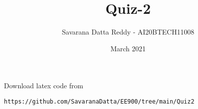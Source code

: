 \documentclass[journal,12pt,twocolumn]{IEEEtran}
\date{March 2021}
\DeclareMathOperator*{\Res}{Res}
\begin{document}
\newcommand{\multlinecomment}[1]{\directlua{-- #1}}
\newcommand{\BEQA}{\begin{eqnarray}}
\newcommand{\EEQA}{\end{eqnarray}}
\newcommand{\define}{\stackrel{\triangle}{=}}

\raggedbottom
\setlength{\parindent}{0pt}
\providecommand{\mbf}{\mathbf}
\providecommand{\pr}[1]{\ensuremath{\Pr\left(#1\right)}}
\providecommand{\qfunc}[1]{\ensuremath{Q\left(#1\right)}}
\providecommand{\fn}[1]{\ensuremath{f\left(#1\right)}}
\providecommand{\e}[1]{\ensuremath{E\left(#1\right)}}
\providecommand{\sbrak}[1]{\ensuremath{{}\left[#1\right]}}
\providecommand{\lsbrak}[1]{\ensuremath{{}\left[#1\right.}}
\providecommand{\rsbrak}[1]{\ensuremath{{}\left.#1\right]}}
\providecommand{\brak}[1]{\ensuremath{\left(#1\right)}}
\providecommand{\lbrak}[1]{\ensuremath{\left(#1\right.}}
\providecommand{\rbrak}[1]{\ensuremath{\left.#1\right)}}
\providecommand{\cbrak}[1]{\ensuremath{\left\{#1\right\}}}
\providecommand{\lcbrak}[1]{\ensuremath{\left\{#1\right.}}
\providecommand{\rcbrak}[1]{\ensuremath{\left.#1\right\}}}
\theoremstyle{remark}
\newtheorem{rem}{Remark}
\newcommand{\sgn}{\mathop{\mathrm{sgn}}}
\providecommand{\abs}[1]{\vert#1\vert}
\providecommand{\res}[1]{\Res\displaylimits_{#1}} 
\providecommand{\norm}[1]{\lVert#1\rVert}
\providecommand{\mtx}[1]{\mathbf{#1}}
\providecommand{\mean}[1]{E[ #1 ]}
\providecommand{\fourier}{\overset{\mathcal{F}}{ \rightleftharpoons}}
\providecommand{\system}{\overset{\mathcal{H}}{ \longleftrightarrow}}
\newcommand{\solution}{\noindent \textbf{Solution: }}
\newcommand{\cosec}{\,\text{cosec}\,}
\providecommand{\dec}[2]{\ensuremath{\overset{#1}{\underset{#2}{\gtrless}}}}
\newcommand{\myvec}[1]{\ensuremath{\begin{pmatrix}#1\end{pmatrix}}}
\newcommand{\mydet}[1]{\ensuremath{\begin{vmatrix}#1\end{vmatrix}}}
\makeatletter
\vspace{3cm}
\title{Quiz-2}
\author{Savarana Datta Reddy - AI20BTECH11008}
\maketitle
\newpage
\bigskip
\renewcommand{\thetable}{\theenumi}

%
Download latex code from 
%
\begin{lstlisting}
https://github.com/SavaranaDatta/EE900/tree/main/Quiz2
\end{lstlisting}
\end{document}
